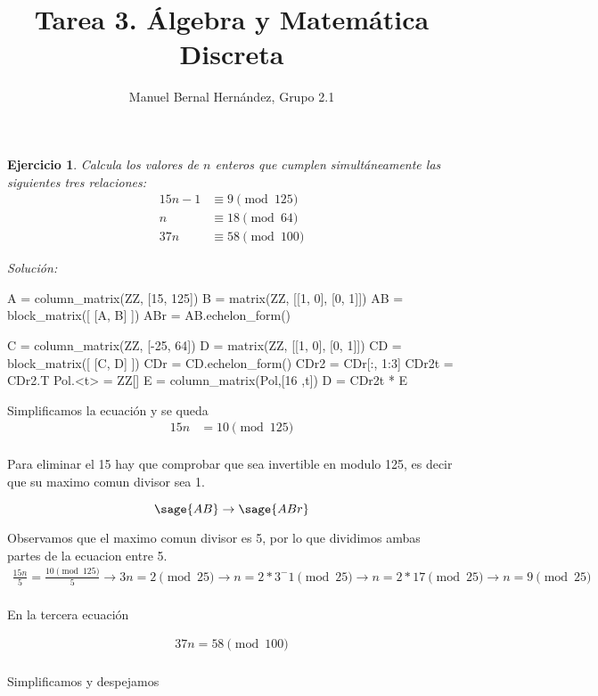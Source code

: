 \documentclass{amsart}
\title{Tarea 3. Álgebra y Matemática Discreta}
\author{Manuel Bernal Hernández, Grupo 2.1}
\newtheorem{ejer}{Ejercicio}
\begin{document}
\maketitle

\begin{ejer}
Calcula los valores de $n$ enteros que cumplen simultáneamente las siguientes
tres relaciones:
\begin{align*}
15n-1 &\equiv 9 \pmod{125} \\
n     &\equiv 18 \pmod{64} \\
37n   &\equiv 58 \pmod{100}
\end{align*}
\end{ejer}

{\it Solución: }

\begin{sageblock}
A = column_matrix(ZZ, [15, 125])
B = matrix(ZZ, [[1, 0], [0, 1]])
AB = block_matrix([ [A, B] ])
ABr = AB.echelon_form()

C = column_matrix(ZZ, [-25, 64])
D = matrix(ZZ, [[1, 0], [0, 1]])
CD = block_matrix([ [C, D] ])
CDr = CD.echelon_form()
CDr2 = CDr[:, 1:3]
CDr2t = CDr2.T
Pol.<t> = ZZ[]
E = column_matrix(Pol,[16 ,t])
D = CDr2t * E
\end{sageblock}
	
Simplificamos la ecuación y se queda
\begin{align*}
15n &= 10 \pmod{125}\\
\end{align*}

Para eliminar el 15 hay que comprobar que sea invertible en modulo 125, es decir que su maximo comun divisor sea 1.

\[\sage{AB} \to \sage{ABr} \]

Observamos que el maximo comun divisor es 5, por lo que dividimos ambas partes de la ecuacion entre 5.
\begin{align*}
\frac{15n}{5} = \frac{10 \pmod{125} }{5} \to 3n = 2 \pmod{25} \to n = 2 * 3^-1 \pmod{25} \to n = 2*17 \pmod{25} \to n = 9 \pmod{25}\\
\end{align*}

En la tercera ecuación


\begin{align*}
37n = 58 \pmod{100}\\
\end{align*}

Simplificamos y despejamos
\end{document}

